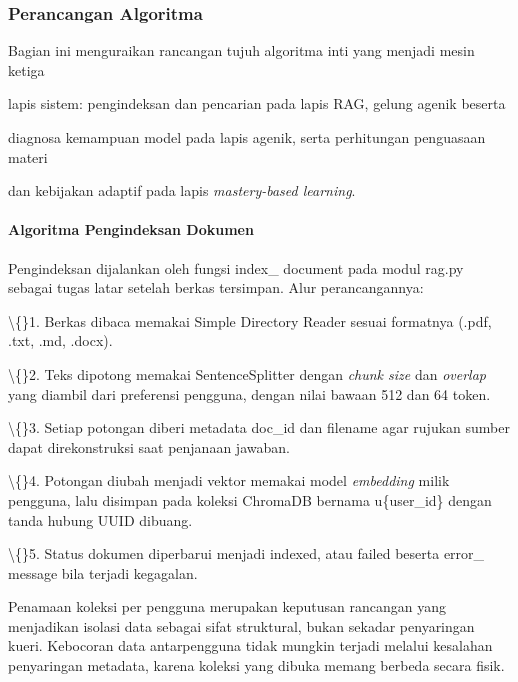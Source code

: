 \documentclass[12pt,a4paper]{article}
\begin{document}
\subsubsection*{Perancangan Algoritma}

Bagian ini menguraikan rancangan tujuh algoritma inti yang menjadi mesin ketiga



lapis sistem: pengindeksan dan pencarian pada lapis RAG, gelung agenik beserta



diagnosa kemampuan model pada lapis agenik, serta perhitungan penguasaan materi



dan kebijakan adaptif pada lapis \textit{mastery-based learning}.



\paragraph*{Algoritma Pengindeksan Dokumen}

Pengindeksan dijalankan oleh fungsi index\_ document pada modul rag.py sebagai tugas latar setelah berkas tersimpan. Alur perancangannya:



\textbackslash\{\}1. Berkas dibaca memakai Simple Directory Reader sesuai formatnya (.pdf, .txt, .md, .docx).



\textbackslash\{\}2. Teks dipotong memakai SentenceSplitter dengan \textit{chunk size} dan \textit{overlap} yang diambil dari preferensi pengguna, dengan nilai bawaan 512 dan 64 token.



\textbackslash\{\}3. Setiap potongan diberi metadata doc\_id dan filename agar rujukan sumber dapat direkonstruksi saat penjanaan jawaban.



\textbackslash\{\}4. Potongan diubah menjadi vektor memakai model \textit{embedding} milik pengguna, lalu disimpan pada koleksi ChromaDB bernama u\{user\_id\} dengan tanda hubung UUID dibuang.



\textbackslash\{\}5. Status dokumen diperbarui menjadi indexed, atau failed beserta error\_ message bila terjadi kegagalan.



Penamaan koleksi per pengguna merupakan keputusan rancangan yang menjadikan isolasi data sebagai sifat struktural, bukan sekadar penyaringan kueri. Kebocoran data antarpengguna tidak mungkin terjadi melalui kesalahan penyaringan metadata, karena koleksi yang dibuka memang berbeda secara fisik.
\end{document}
